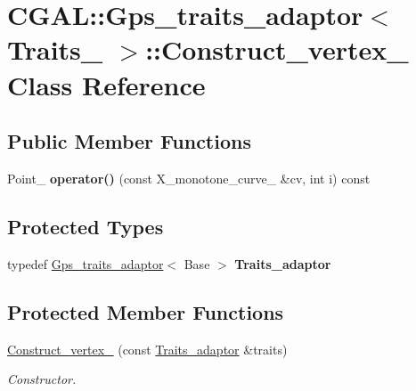 \hypertarget{class_c_g_a_l_1_1_gps__traits__adaptor_1_1_construct__vertex__2}{}\section{C\+G\+AL\+::Gps\+\_\+traits\+\_\+adaptor$<$ Traits\+\_\+ $>$\+::Construct\+\_\+vertex\+\_ Class Reference}
\label{class_c_g_a_l_1_1_gps__traits__adaptor_1_1_construct__vertex__2}
\subsection*{Public Member Functions}
\begin{DoxyCompactItemize}
\item 
\mbox{\label{class_c_g_a_l_1_1_gps__traits__adaptor_1_1_construct__vertex__2_aaf45479f66b915fb81cbedd0b0c8d07c}} 
Point\+\_ {\bfseries operator()} (const X\+\_\+monotone\+\_\+curve\+\_ \&cv, int i) const
\end{DoxyCompactItemize}
\subsection*{Protected Types}
\begin{DoxyCompactItemize}
\item 
\mbox{\label{class_c_g_a_l_1_1_gps__traits__adaptor_1_1_construct__vertex__2_a4618aa3c4260f8debc8ef49e08e14b64}} 
typedef \mbox{\hyperlink{class_c_g_a_l_1_1_gps__traits__adaptor}{Gps\+\_\+traits\+\_\+adaptor}}$<$ Base $>$ {\bfseries Traits\+\_\+adaptor}
\end{DoxyCompactItemize}
\subsection*{Protected Member Functions}
\begin{DoxyCompactItemize}
\item 
\mbox{\hyperlink{class_c_g_a_l_1_1_gps__traits__adaptor_1_1_construct__vertex__2_ade4df041a1e859d7c17c0ba660bdead6}{Construct\+\_\+vertex\+\_}} (const \mbox{\hyperlink{class_c_g_a_l_1_1_gps__traits__adaptor}{Traits\+\_\+adaptor}} \&traits)
\begin{DoxyCompactList}\small\item\em Constructor. \end{DoxyCompactList}\end{DoxyCompactItemize}
